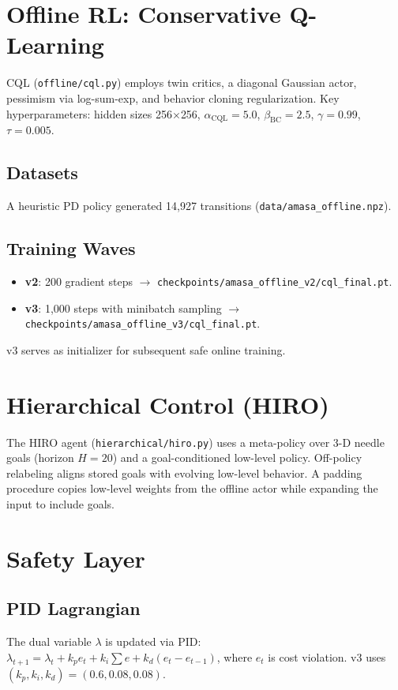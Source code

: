 \documentclass[conference]{IEEEtran}
\begin{document}
\section{Offline RL: Conservative Q-Learning}
CQL (\texttt{offline/cql.py}) employs twin critics, a diagonal Gaussian actor, pessimism via log-sum-exp, and behavior cloning regularization. Key hyperparameters: hidden sizes 256$\times$256, $\alpha_{\text{CQL}}=5.0$, $\beta_{\text{BC}}=2.5$, $\gamma=0.99$, $\tau=0.005$.

\subsection{Datasets}
A heuristic PD policy generated 14{,}927 transitions (\texttt{data/amasa\_offline.npz}).

\subsection{Training Waves}
\begin{itemize}[leftmargin=*]
    \item \textbf{v2}: 200 gradient steps $\rightarrow$ \texttt{checkpoints/amasa\_offline\_v2/cql\_final.pt}.
    \item \textbf{v3}: 1{,}000 steps with minibatch sampling $\rightarrow$ \texttt{checkpoints/amasa\_offline\_v3/cql\_final.pt}.
\end{itemize}
v3 serves as initializer for subsequent safe online training.

\section{Hierarchical Control (HIRO)}
The HIRO agent (\texttt{hierarchical/hiro.py}) uses a meta-policy over 3-D needle goals (horizon $H{=}20$) and a goal-conditioned low-level policy. Off-policy relabeling aligns stored goals with evolving low-level behavior. A padding procedure copies low-level weights from the offline actor while expanding the input to include goals.

\section{Safety Layer}
\subsection{PID Lagrangian}
The dual variable $\lambda$ is updated via PID:
$\lambda_{t+1}=\lambda_t + k_p e_t + k_i \sum e + k_d (e_t-e_{t-1})$,
where $e_t$ is cost violation. v3 uses $(k_p,k_i,k_d)=(0.6,0.08,0.08)$.
\end{document}
